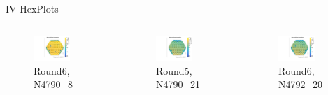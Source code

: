 \documentclass{beamer}
\begin{document}
\begin{frame}{IV HexPlots}
\begin{columns}
    \begin{figure}
      \includegraphics[width=0.7\textwidth]{plots/N4790_8.pdf}
      \caption{Round6, N4790\_8}
    \end{figure}

    \begin{figure}
      \includegraphics[width=0.7\textwidth]{plots/N4790_21.pdf}
      \caption{Round5, N4790\_21}
    \end{figure}

    \begin{figure}
      \includegraphics[width=0.7\textwidth]{plots/N4792_20.pdf}
      \caption{Round6, N4792\_20}
    \end{figure}

  \end{columns}
\end{frame}
\end{document}
